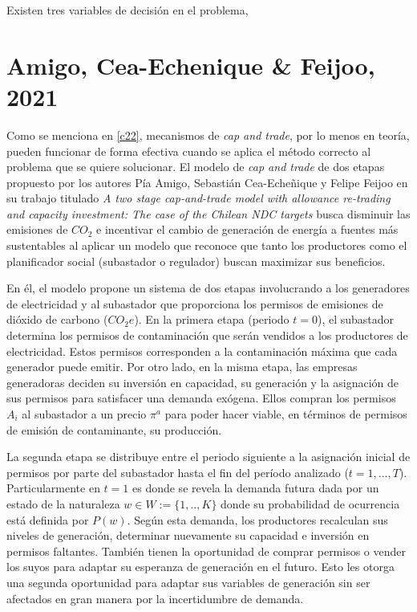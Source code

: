 Existen tres variables de decisión en el problema,




\section{Amigo, Cea-Echenique \& Feijoo, 2021}

Como se menciona en \ref{c22}, mecanismos de \textit{cap and trade}, por lo menos en teoría, pueden funcionar de forma efectiva cuando se aplica el método correcto al problema que se quiere solucionar. El modelo de \textit{cap and trade} de dos etapas propuesto por los autores Pía Amigo, Sebastián Cea-Echeñique y Felipe Feijoo en su trabajo titulado \textit{A two stage cap-and-trade model with allowance re-trading and capacity investment: The case of the Chilean NDC targets} busca disminuir las emisiones de $CO_2$ e incentivar el cambio de generación de energía a fuentes más sustentables al aplicar un modelo que reconoce que tanto los productores como el planificador social (subastador o regulador) buscan maximizar sus beneficios.
\vspace{2.5mm}

En él, el modelo propone un sistema de dos etapas involucrando a los generadores de electricidad y al subastador que proporciona los permisos de emisiones de dióxido de carbono ($CO_2 e$). En la primera etapa (periodo $t=0$), el subastador determina los permisos de contaminación que serán vendidos a los productores de electricidad. Estos permisos corresponden a la contaminación máxima que cada generador puede emitir. Por otro lado, en la misma etapa, las empresas generadoras deciden su inversión en capacidad, su generación y la asignación de sus permisos para satisfacer una demanda exógena. Ellos compran los permisos $A_i$ al subastador a un precio $\pi^a$ para poder hacer viable, en términos de permisos de emisión de contaminante, su producción. 
\vspace{2.5mm}

La segunda etapa se distribuye entre el periodo siguiente a la asignación inicial de permisos por parte del subastador hasta el fin del período analizado ($t=1,...,T$). Particularmente en $t=1$ es donde se revela la demanda futura dada por un estado de la naturaleza $w \in W :=\{ 1,..,K\}$ donde su probabilidad de ocurrencia está definida por $P(w)$. Según esta demanda, los productores recalculan sus niveles de generación, determinar nuevamente su capacidad e inversión en permisos faltantes. También tienen la oportunidad de comprar permisos o vender los suyos para adaptar su esperanza de generación en el futuro. Esto les otorga una segunda oportunidad para adaptar sus variables de generación sin ser afectados en gran manera por la incertidumbre de demanda.
\vspace{2.5mm}


